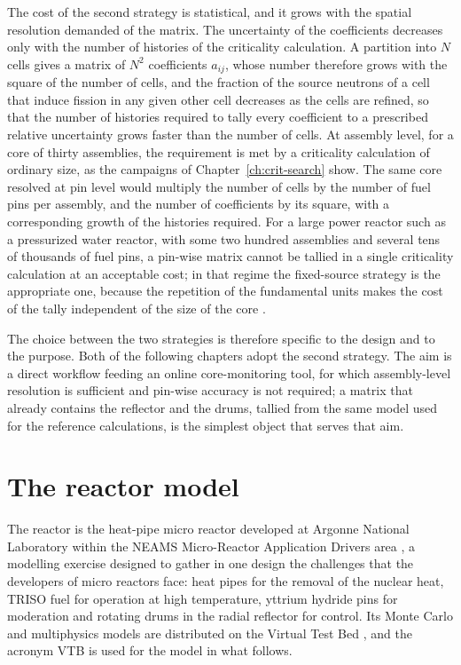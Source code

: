 The cost of the second strategy is statistical, and it grows with the spatial
resolution demanded of the matrix. The uncertainty of the coefficients
decreases only with the number of histories of the criticality calculation. A
partition into $N$ cells gives a matrix of $N^2$ coefficients $a_{ij}$, whose
number therefore grows with the square of the number of cells, and the
fraction of the source neutrons of a cell that induce fission in any given
other cell decreases as the cells are refined, so that the number of histories
required to tally every coefficient to a prescribed relative uncertainty grows
faster than the number of cells. At assembly level, for a core of thirty
assemblies, the requirement is met by a criticality calculation of ordinary
size, as the campaigns of Chapter~\ref{ch:crit-search} show. The same core
resolved at pin level would multiply the number of cells by the number of fuel
pins per assembly, and the number of coefficients by its square, with a
corresponding growth of the histories required. For a large power reactor such
as a pressurized water reactor, with some two hundred assemblies and several
tens of thousands of fuel pins, a pin-wise matrix cannot be tallied in a single criticality calculation at an
acceptable cost; in that regime the fixed-source strategy is the appropriate
one, because the repetition of the fundamental units
makes the cost of the tally independent of the size of the core
\cite{WaltersNSE2018}.

The choice between the two strategies is therefore specific to the design and
to the purpose. Both of the following chapters adopt the second strategy. The aim is a
direct workflow feeding an online core-monitoring tool, for which
assembly-level resolution is sufficient and pin-wise accuracy is not required;
a matrix that already contains the reflector and the drums, tallied from the
same model used for the reference calculations, is the simplest object that
serves that aim.

\section{The reactor model}\label{fm:sec:model}

The reactor is the heat-pipe micro reactor developed at Argonne National
Laboratory within the NEAMS Micro-Reactor Application Drivers area
\cite{Stauff2024}, a modelling exercise designed to gather in one design the
challenges that the developers of micro reactors face: heat pipes for the removal of
the nuclear heat, TRISO fuel for operation at high temperature, yttrium
hydride pins for moderation and rotating drums in the radial reflector for
control. Its Monte Carlo and multiphysics models are distributed on the Virtual
Test Bed \cite{moose_vtb_mrad_description}, and the acronym VTB is used for the
model in what follows.

